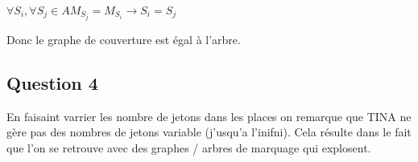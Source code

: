 $\forall S_i, \forall S_j \in A M_{S_j} = M_{S_i} \rightarrow S_i = S_j$

Donc le graphe de couverture est égal à l'arbre.

\subsection{Question 4}

En faisaint varrier les nombre de jetons dans les places on remarque que TINA ne gère pas des nombres de jetons variable (j'usqu'a l'inifni). Cela résulte dans le fait que l'on se retrouve avec des graphes / arbres de marquage qui explosent.
